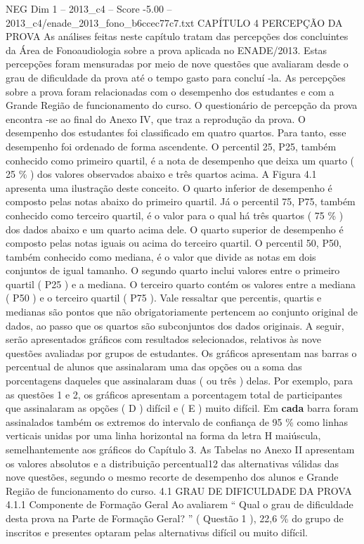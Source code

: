 \begin{textsample}{NEG Dim 1 – 2013\_c4 – Score -5.00 – 2013\_c4/enade\_2013\_fono\_b6ccec77c7.txt}  \label{ex:f1_neg_060}
CAPÍTULO 4 PERCEPÇÃO DA PROVA As análises feitas neste capítulo tratam das percepções dos concluintes da Área de Fonoaudiologia sobre a prova aplicada no ENADE/2013.
Estas percepções foram mensuradas por meio de nove questões que avaliaram desde o grau de dificuldade da prova até o tempo gasto para concluí -la.
As percepções sobre a prova foram relacionadas com o desempenho dos estudantes e com a Grande Região de funcionamento do curso.
O questionário de percepção da prova encontra -se ao final do Anexo IV, que traz a reprodução da prova.
O desempenho dos estudantes foi classificado em quatro quartos.
Para tanto, esse desempenho foi ordenado de forma ascendente.
O percentil 25, P25, também conhecido como primeiro quartil, é a nota de desempenho que deixa um quarto ( 25 \% ) dos valores observados abaixo e três quartos acima.
A Figura 4.1 apresenta uma ilustração deste conceito.
O quarto inferior de desempenho é composto pelas notas abaixo do primeiro quartil.
Já o percentil 75, P75, também conhecido como terceiro quartil, é o valor para o qual há três quartos ( 75 \% ) dos dados abaixo e um quarto acima dele.
O quarto superior de desempenho é composto pelas notas iguais ou acima do terceiro quartil.
O percentil 50, P50, também conhecido como mediana, é o valor que divide as notas em dois conjuntos de igual tamanho.
O segundo quarto inclui valores entre o primeiro quartil ( P25 ) e a mediana.
O terceiro quarto contém os valores entre a mediana ( P50 ) e o terceiro quartil ( P75 ).
Vale ressaltar que percentis, quartis e medianas são pontos que não obrigatoriamente pertencem ao conjunto original de dados, ao passo que os quartos são subconjuntos dos dados originais.
A seguir, serão apresentados gráficos com resultados selecionados, relativos às nove questões avaliadas por grupos de estudantes.
Os gráficos apresentam nas barras o percentual de alunos que assinalaram uma das opções ou a soma das porcentagens daqueles que assinalaram duas ( ou três ) delas.
Por exemplo, para as questões 1 e 2, os gráficos apresentam a porcentagem total de participantes que assinalaram as opções ( D ) difícil e ( E ) muito difícil.
Em \textbf{cada} barra foram assinalados também os extremos do intervalo de confiança de 95 \% como linhas verticais unidas por uma linha horizontal na forma da letra H maiúscula, semelhantemente aos gráficos do Capítulo 3.
As Tabelas no Anexo II apresentam os valores absolutos e a distribuição percentual12 das alternativas válidas das nove questões, segundo o mesmo recorte de desempenho dos alunos e Grande Região de funcionamento do curso. 4.1 GRAU DE DIFICULDADE DA PROVA 4.1.1 Componente de Formação Geral Ao avaliarem “ Qual o grau de dificuldade desta prova na Parte de Formação Geral? ” ( Questão 1 ), 22,6 \% do grupo de inscritos e presentes optaram pelas alternativas difícil ou muito difícil.

\end{textsample}
